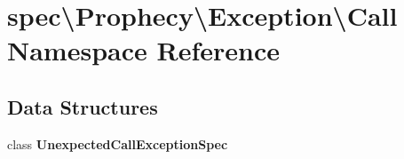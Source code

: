 \section{spec\textbackslash{}Prophecy\textbackslash{}Exception\textbackslash{}Call Namespace Reference}
\label{namespacespec_1_1_prophecy_1_1_exception_1_1_call}
\subsection*{Data Structures}
\begin{DoxyCompactItemize}
\item 
class {\bf Unexpected\+Call\+Exception\+Spec}
\end{DoxyCompactItemize}

